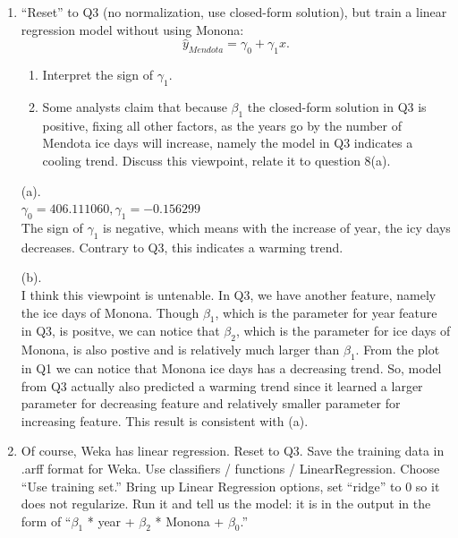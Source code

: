 \documentclass[a4paper]{article}
\theoremstyle{definition}
\newenvironment{soln}{
    \leavevmode\color{blue}\ignorespaces
}{}
\begin{document}
\begin{enumerate}
\item 
``Reset'' to Q3 (no normalization,  use closed-form solution), but train a linear regression model without using Monona:
$$\hat y_{Mendota} = \gamma_0 + \gamma_1 x.$$
  \begin{enumerate}
  \item Interpret the sign of $\gamma_1$.
  \item Some analysts claim that because $\beta_1$ the closed-form solution in Q3 is positive, fixing all other factors, as the years go by the number of Mendota ice days will increase, namely the model in Q3 indicates a cooling trend. Discuss this viewpoint, relate it to question 8(a).
  \end{enumerate}

\begin{soln}
(a).\\
 $\gamma_0 = 406.111060, \gamma_1 =  -0.156299$\\
 The sign of $\gamma_1$ is negative, which means with the increase of year, the icy days decreases. Contrary to Q3, this indicates a warming trend.

(b).\\
I think this viewpoint is untenable. In Q3, we have another feature, namely the ice days of Monona. Though $\beta_1$, which is the parameter for year feature in Q3, is positve, we can notice that $\beta_2$, which is the parameter for ice days of Monona, is also postive and is relatively much larger than $\beta_1$. From the plot in Q1 we can notice that Monona ice days has a decreasing trend. So, model from Q3 actually also predicted a warming trend since it learned a larger parameter for decreasing feature and relatively smaller parameter for increasing feature. This result is consistent with (a).
\end{soln}

\item
Of course, Weka has linear regression.  Reset to Q3.  Save the training data in .arff format for Weka.  Use classifiers / functions / LinearRegression.  Choose ``Use training set.''  
  Bring up Linear Regression options, set ``ridge'' to 0 so it does not regularize.  Run it and tell us the model: it is in the output in the form of ``$\beta_1$ * year + $\beta_2$ * Monona + $\beta_0$.'' 


\end{enumerate}
\end{document}

